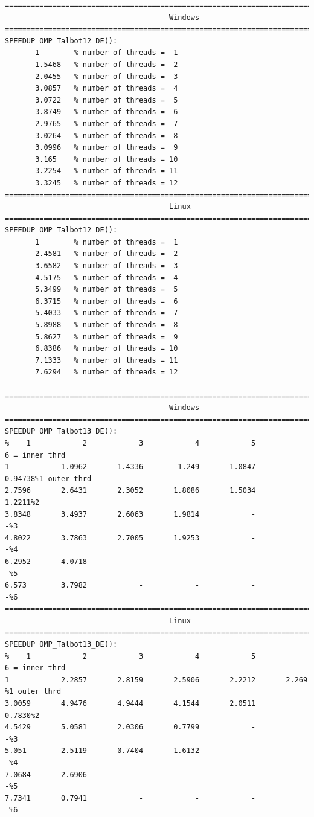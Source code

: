 \documentclass[a4paper,10pt]{report}%
\begin{document}
\begin{lstlisting}
====================================================================================
                                      Windows
====================================================================================
SPEEDUP OMP_Talbot12_DE():
       1        % number of threads =  1
       1.5468   % number of threads =  2
       2.0455   % number of threads =  3
       3.0857   % number of threads =  4
       3.0722   % number of threads =  5
       3.8749   % number of threads =  6
       2.9765   % number of threads =  7
       3.0264   % number of threads =  8
       3.0996   % number of threads =  9
       3.165    % number of threads = 10
       3.2254   % number of threads = 11
       3.3245   % number of threads = 12
====================================================================================
                                      Linux
====================================================================================
SPEEDUP OMP_Talbot12_DE():
       1        % number of threads =  1
       2.4581   % number of threads =  2
       3.6582   % number of threads =  3
       4.5175   % number of threads =  4
       5.3499   % number of threads =  5
       6.3715   % number of threads =  6
       5.4033   % number of threads =  7
       5.8988   % number of threads =  8
       5.8627   % number of threads =  9
       6.8386   % number of threads = 10
       7.1333   % number of threads = 11
       7.6294   % number of threads = 12

====================================================================================
                                      Windows
====================================================================================
SPEEDUP OMP_Talbot13_DE():
%    1            2            3            4            5            6 = inner thrd
1            1.0962       1.4336        1.249       1.0847      0.94738%1 outer thrd
2.7596       2.6431       2.3052       1.8086       1.5034       1.2211%2
3.8348       3.4937       2.6063       1.9814            -            -%3
4.8022       3.7863       2.7005       1.9253            -            -%4
6.2952       4.0718            -            -            -            -%5
6.573        3.7982            -            -            -            -%6
====================================================================================
                                      Linux
====================================================================================
SPEEDUP OMP_Talbot13_DE():
%    1            2            3            4            5            6 = inner thrd
1            2.2857       2.8159       2.5906       2.2212       2.269 %1 outer thrd
3.0059       4.9476       4.9444       4.1544       2.0511       0.7830%2
4.5429       5.0581       2.0306       0.7799            -            -%3
5.051        2.5119       0.7404       1.6132            -            -%4
7.0684       2.6906            -            -            -            -%5
7.7341       0.7941            -            -            -            -%6
\end{lstlisting}
\end{document}
